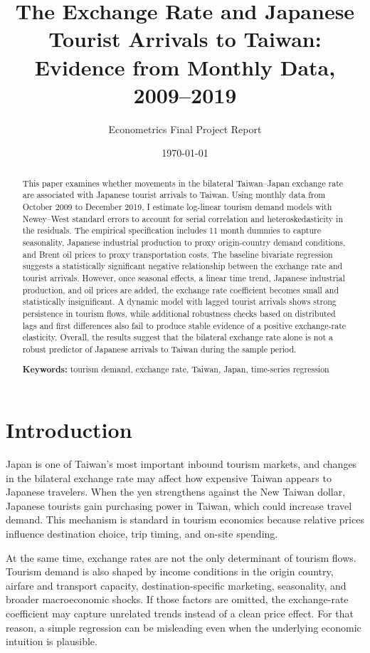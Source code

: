 \documentclass[12pt,a4paper]{article}
\title{The Exchange Rate and Japanese Tourist Arrivals to Taiwan:\\Evidence from Monthly Data, 2009--2019}
\author{Econometrics Final Project Report}
\date{\today}
\begin{document}
\maketitle

\begin{abstract}
This paper examines whether movements in the bilateral Taiwan--Japan exchange rate are associated with Japanese tourist arrivals to Taiwan. Using monthly data from October 2009 to December 2019, I estimate log-linear tourism demand models with Newey--West standard errors to account for serial correlation and heteroskedasticity in the residuals. The empirical specification includes 11 month dummies to capture seasonality, Japanese industrial production to proxy origin-country demand conditions, and Brent oil prices to proxy transportation costs. The baseline bivariate regression suggests a statistically significant negative relationship between the exchange rate and tourist arrivals. However, once seasonal effects, a linear time trend, Japanese industrial production, and oil prices are added, the exchange rate coefficient becomes small and statistically insignificant. A dynamic model with lagged tourist arrivals shows strong persistence in tourism flows, while additional robustness checks based on distributed lags and first differences also fail to produce stable evidence of a positive exchange-rate elasticity. Overall, the results suggest that the bilateral exchange rate alone is not a robust predictor of Japanese arrivals to Taiwan during the sample period.

\textbf{Keywords:} tourism demand, exchange rate, Taiwan, Japan, time-series regression
\end{abstract}

\section{Introduction}

Japan is one of Taiwan's most important inbound tourism markets, and changes in the bilateral exchange rate may affect how expensive Taiwan appears to Japanese travelers. When the yen strengthens against the New Taiwan dollar, Japanese tourists gain purchasing power in Taiwan, which could increase travel demand. This mechanism is standard in tourism economics because relative prices influence destination choice, trip timing, and on-site spending.

At the same time, exchange rates are not the only determinant of tourism flows. Tourism demand is also shaped by income conditions in the origin country, airfare and transport capacity, destination-specific marketing, seasonality, and broader macroeconomic shocks. If those factors are omitted, the exchange-rate coefficient may capture unrelated trends instead of a clean price effect. For that reason, a simple regression can be misleading even when the underlying economic intuition is plausible.
\end{document}
